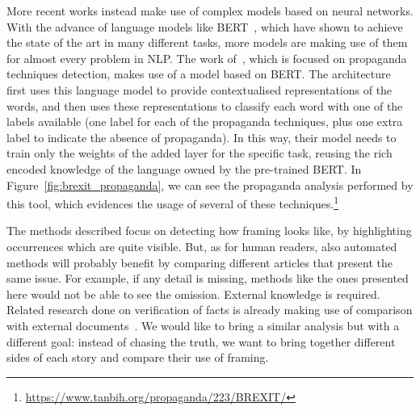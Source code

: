 More recent works instead make use of complex models based on neural networks. With the advance of language models like BERT~\cite{devlin2018bert}, which have shown to achieve the state of the art in many different tasks,
more models are making use of them for almost every problem in NLP.
The work of~\citet{da2019fine}, which is focused on propaganda techniques detection, makes use of a model based on BERT.
The architecture first uses this language model to provide contextualised representations of the words, and then uses these representations to classify each word with one of the labels available (one label for each of the propaganda techniques, plus one extra label to indicate the absence of propaganda).
In this way, their model needs to train only the weights of the added layer for the specific task, reusing the rich encoded knowledge of the language owned by the pre-trained BERT.
In Figure~\ref{fig:brexit_propaganda}, we can see the propaganda analysis performed by this tool, which evidences the usage of several of these techniques.\footnote{\url{https://www.tanbih.org/propaganda/223/BREXIT/}}

The methods described focus on detecting how framing looks like, by highlighting occurrences which are quite visible.
But, as for human readers, also automated methods will probably benefit by comparing different articles that present the same issue.
For example, if any detail is missing, methods like the ones presented here would not be able to see the omission.
External knowledge is required.
Related research done on verification of facts is already making use of comparison with external documents~\cite{yin2008truth,karadzhov2017fully}.
We would like to bring a similar analysis but with a different goal: instead of chasing the truth, we want to bring together different sides of each story and compare their use of framing. 









